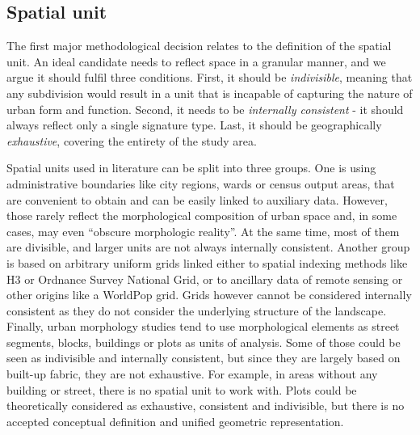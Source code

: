 \documentclass[fleqn,10pt]{wlscirep}
\begin{document}
\subsection*{Spatial unit}
The first major methodological decision relates to the definition of the
spatial unit. An ideal candidate needs to reflect space in a granular manner, and we argue
it should fulfil three conditions. First, it should be \textit{indivisible},
meaning that any subdivision would result in a unit that is incapable of
capturing the nature of urban form and function. Second, it needs to be
\textit{internally consistent} - it should always reflect only a single signature type.
Last, it should be geographically \textit{exhaustive}, covering the entirety of the study
area.

Spatial units used in literature can be split into three groups. One is using
administrative boundaries like city regions\cite{angel2020}, wards or census output areas\cite{alexiou2016}, that are
convenient to obtain and can be easily linked to auxiliary data. However,
those rarely reflect the morphological composition of urban space and, in some cases, may
even “obscure morphologic reality”\cite{taubenbock2019new}. At the same time, most of them
are divisible, and larger units are not always internally consistent. Another group is based on
arbitrary uniform grids linked either to spatial indexing methods like
H3\cite{brodsky2018h3} or Ordnance Survey
National Grid, or to ancillary data of remote sensing or other origins like a
WorldPop grid\cite{jochem2021tools}. Grids however cannot be considered internally
consistent as
they do not consider the underlying structure of the landscape.
Finally, urban morphology studies tend to use morphological elements as
street segments\cite{araldi2019}, blocks\cite{gil2012},
buildings\cite{hamaina2012a} or plots\cite{bobkova2019} as units of analysis.
Some of those
could be seen as indivisible and internally consistent, but since they are largely based
on built-up fabric, they are not exhaustive. For example, in areas without any building or
street, there
is no spatial unit to work with. Plots could be theoretically considered as exhaustive,
consistent and indivisible, but there is no accepted conceptual definition and unified
geometric representation\cite{kropf2018}.
\end{document}
